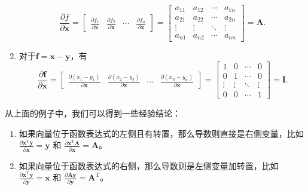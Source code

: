 \begin{solution}
\begin{enumerate}
              \[
                  \frac{\partial f}{\partial \bm{x}} =
                  \begin{bmatrix}
                      \frac{\partial f_1}{\partial \bm{x}} & \frac{\partial f_2}{\partial \bm{x}} & \cdots & \frac{\partial f_n}{\partial \bm{x}}
                  \end{bmatrix} =
                  \begin{bmatrix}
                      a_{11} & a_{12} & \cdots & a_{1n} \\
                      a_{21} & a_{22} & \cdots & a_{2n} \\
                      \vdots & \vdots & \ddots & \vdots \\
                      a_{n1} & a_{n2} & \cdots & a_{nn}
                  \end{bmatrix} = \mathbf{A}.
              \]
        \item 对于\( \bm{f} = \bm{x} - \bm{y} \)，有
              \[
                  \frac{\partial \bm{f}}{\partial \bm{x}} =
                  \begin{bmatrix}
                      \frac{\partial (x_1 - y_1)}{\partial \bm{x}} & \frac{\partial (x_2 - y_2)}{\partial \bm{x}} & \cdots & \frac{\partial (x_n - y_n)}{\partial \bm{x}}
                  \end{bmatrix} =
                  \begin{bmatrix}
                      1      & 0      & \cdots & 0      \\
                      0      & 1      & \cdots & 0      \\
                      \vdots & \vdots & \ddots & \vdots \\
                      0      & 0      & \cdots & 1
                  \end{bmatrix} = \mathbf{I}.
              \]
    \end{enumerate}
\end{solution}

从上面的例子中，我们可以得到一些经验结论：

\begin{enumerate}
    \item 如果向量位于函数表达式的左侧且有转置，那么导数则直接是右侧变量，比如\( \frac{\partial \bm{x}^{\mathrm{T}} \bm{y}}{\partial \bm{x}} = \bm{y}\) 和 \( \frac{\partial \bm{x}^{\mathrm{T}} \mathbf{A}}{\partial \bm{x}} = \mathbf{A} \)。
    \item 如果向量位于函数表达式的右侧，那么导数则是左侧变量加转置，比如\( \frac{\partial \bm{x}^{\mathrm{T}} \bm{y}}{\partial \bm{y}} = \bm{x}\) 和 \( \frac{\partial \mathbf{A} \bm{y}}{\partial \bm{y}} = \mathbf{A}^{\mathrm{T}} \)。
\end{enumerate}

